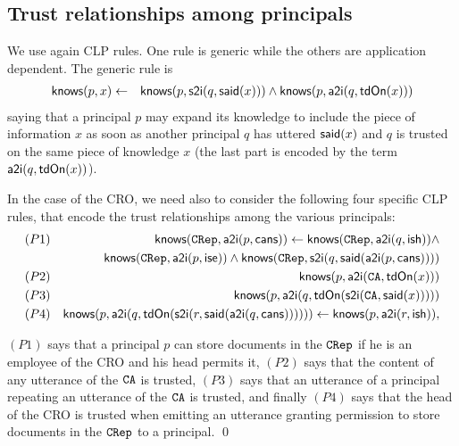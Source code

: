 \documentclass[conference]{llncs}
\newcommand{\theCA}{\ensuremath \mathtt{CA}}
\newcommand{\CRep}{\ensuremath \mathtt{CRep}}
\newcommand{\canstoredoc}{\ensuremath \mathsf{cans}}
\newcommand{\ishead}{\ensuremath \mathsf{ish}}
\newcommand{\isemployee}{\ensuremath \mathsf{ise}}
\newcommand{\know}{\ensuremath \mathsf{knows}}
\newcommand{\atoi}{\ensuremath \mathsf{a2i}}
\newcommand{\stoi}{\ensuremath \mathsf{s2i}}
\newcommand{\said}{\ensuremath \mathsf{said}}
\newcommand{\tdOn}{\ensuremath \mathsf{tdOn}}
\newcommand{\CRO}{CRO}
\begin{document}
\subsection{Trust relationships among principals} 
\label{subsec:trustrelations}
We use again CLP rules.
One rule is generic while the others are application dependent. The generic rule is
\begin{eqnarray}
  \label{eq:trust-app}
  \know(p, x) & \leftarrow &
   \know(p, \stoi(q,\said(x))) \wedge 
   \know(p, \atoi(q,\tdOn(x))) 
\end{eqnarray}
saying that a principal $p$ may expand its knowledge to include the
piece of information $x$ as soon as another principal $q$ has uttered
$\said(x)$ and $q$ is trusted on the same piece of
knowledge $x$ (the last part is encoded by the term
$\atoi(q,\tdOn(x))$).

\begin{example}
\label{ex:rules}
In the case of the \CRO{}, we need also to consider the following four
specific CLP rules, that encode the trust relationships among the
various principals:
\begin{eqnarray*}
(P1) && \know(\CRep,\atoi(p, \canstoredoc))  \leftarrow 
       \know(\CRep, \atoi(q, \ishead)) \wedge \\
     &&
       \know(\CRep, \atoi(p, \isemployee)) \wedge 
       \know(\CRep, \stoi(q,\said(\atoi(p, \canstoredoc)))) \\
(P2) && \know(p, \atoi(\theCA, \tdOn(x))) \\
(P3) && \know(p,\atoi(q,\tdOn(\stoi(\theCA,\said(x))))) \\ 
(P4) && \know(p, \atoi(q,\tdOn(\stoi(r, \said(\atoi(q, \canstoredoc))))) ) 
       \leftarrow  \know(p, \atoi(r, \ishead)),
\end{eqnarray*}

$(P1)$ says that a principal $p$ can store documents in the $\CRep$ if he
is an employee of the \CRO{} and his head permits it, $(P2)$
says that the content of any utterance of the $\theCA$ is trusted, 
$(P3)$ says that an utterance of
a principal repeating an utterance of the $\theCA$ is trusted, and finally 
$(P4)$ says that the head of the \CRO{} is trusted when emitting an utterance
granting permission to store documents in the $\CRep$ to a principal.
\qed
\end{example}
\end{document}

